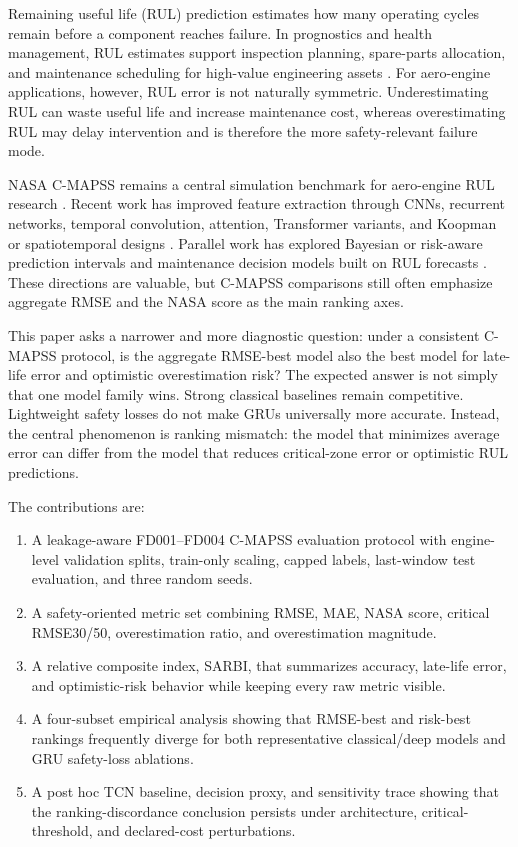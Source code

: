 \documentclass[10pt,twocolumn]{article}
\begin{document}
Remaining useful life (RUL) prediction estimates how many operating cycles remain before a component reaches failure. In prognostics and health management, RUL estimates support inspection planning, spare-parts allocation, and maintenance scheduling for high-value engineering assets \citep{Jardine2006}. For aero-engine applications, however, RUL error is not naturally symmetric. Underestimating RUL can waste useful life and increase maintenance cost, whereas overestimating RUL may delay intervention and is therefore the more safety-relevant failure mode.

NASA C-MAPSS remains a central simulation benchmark for aero-engine RUL research \citep{NASA_PCoE,Saxena2008}. Recent work has improved feature extraction through CNNs, recurrent networks, temporal convolution, attention, Transformer variants, and Koopman or spatiotemporal designs \citep{Babu2016,Zheng2017,Li2018,Liu2023SAETCN,Fan2024STAR,Kim2025KoopmanTransformer}. Parallel work has explored Bayesian or risk-aware prediction intervals \citep{Hu2023Bayesian,Xiang2024BayesianGated} and maintenance decision models built on RUL forecasts \citep{DePater2022,Mitici2023}. These directions are valuable, but C-MAPSS comparisons still often emphasize aggregate RMSE and the NASA score as the main ranking axes.

This paper asks a narrower and more diagnostic question: under a consistent C-MAPSS protocol, is the aggregate RMSE-best model also the best model for late-life error and optimistic overestimation risk? The expected answer is not simply that one model family wins. Strong classical baselines remain competitive. Lightweight safety losses do not make GRUs universally more accurate. Instead, the central phenomenon is ranking mismatch: the model that minimizes average error can differ from the model that reduces critical-zone error or optimistic RUL predictions.

The contributions are:
\begin{enumerate}
    \item A leakage-aware FD001--FD004 C-MAPSS evaluation protocol with engine-level validation splits, train-only scaling, capped labels, last-window test evaluation, and three random seeds.
    \item A safety-oriented metric set combining RMSE, MAE, NASA score, critical RMSE30/50, overestimation ratio, and overestimation magnitude.
    \item A relative composite index, SARBI, that summarizes accuracy, late-life error, and optimistic-risk behavior while keeping every raw metric visible.
    \item A four-subset empirical analysis showing that RMSE-best and risk-best rankings frequently diverge for both representative classical/deep models and GRU safety-loss ablations.
    \item A post hoc TCN baseline, decision proxy, and sensitivity trace showing that the ranking-discordance conclusion persists under architecture, critical-threshold, and declared-cost perturbations.
\end{enumerate}
\end{document}
